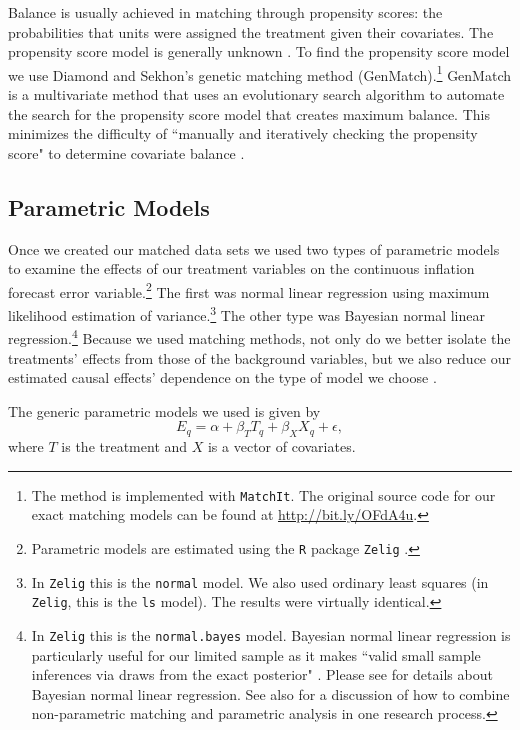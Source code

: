 \documentclass[a4paper]{article}\usepackage{graphicx, color}
\begin{document}
Balance is usually achieved in matching through propensity scores: the probabilities that units were assigned the treatment given their covariates. The propensity score model is generally unknown \citep{Drake1993}. To find the propensity score model we use Diamond and Sekhon's \citeyearpar{Diamond2012} genetic matching method (GenMatch).\footnote{The method is implemented with {\tt{MatchIt}}. The original source code for our exact matching models can be found at {\url{http://bit.ly/OFdA4u}}.} GenMatch is a multivariate method that uses an evolutionary search algorithm to automate the search for the propensity score model that creates maximum balance. This minimizes the difficulty of ``manually and iteratively checking the propensity score" to determine covariate balance \citep[][2]{Diamond2012}. 


\subsection{Parametric Models}

Once we created our matched data sets we used two types of parametric models to examine the effects of our treatment variables on the continuous inflation forecast error variable.\footnote{Parametric models are estimated using the \texttt{R} package \texttt{Zelig} \citep{Zelig2012}.} The first was normal linear regression using maximum likelihood estimation of variance.\footnote{In {\tt{Zelig}} this is the {\tt{normal}} model. We also used ordinary least squares (in \texttt{Zelig}, this is the \texttt{ls} model). The results were virtually identical.} The other type was Bayesian normal linear regression.\footnote{In {\tt{Zelig}} this is the {\tt{normal.bayes}} model. Bayesian normal linear regression is particularly useful for our limited sample as it makes ``valid small sample inferences via draws from the exact posterior" \citep[][38]{Zelig2012}. Please see \cite{Goodrich2007} for details about Bayesian normal linear regression.  See also \cite{Imai2008} for a discussion of how to combine non-parametric matching and parametric analysis in one research process.} Because we used  matching methods, not only do we better isolate the treatments' effects from those of the background variables, but we also reduce our estimated causal effects' dependence on the type of model we choose \cite[200--201]{Ho2007}.

The generic parametric models we used is given by
%
\begin{equation}
    E_{q} = \alpha + \beta_{T} T_{q} + \beta_{X} X_{q} + \epsilon,
\end{equation}
%
where $T$ is the treatment and $X$ is a vector of covariates. 
\end{document}
